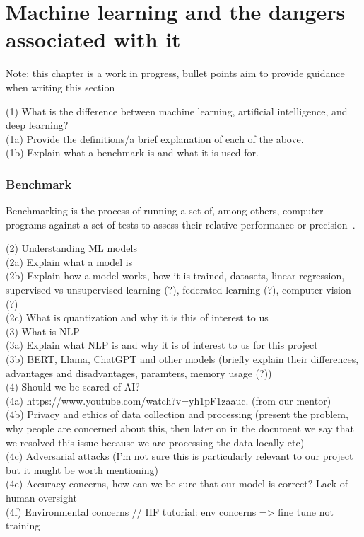 \documentclass[licencjacka,en]{pracamgr}
\begin{document}
\chapter{Machine learning and the dangers associated with it}
Note: this chapter is a work in progress, bullet points aim to provide guidance when writing this section

(1) What is the difference between machine learning, artificial intelligence, and deep learning? \\
(1a) Provide the definitions/a brief explanation of each of the above.\\
(1b) Explain what a benchmark is and what it is used for. \\

\subsection{Benchmark}
Benchmarking is the process of running a set of, among others, computer programs against a set of tests to assess their relative performance or precision~\cite{benchmark}.

(2) Understanding ML models \\
(2a) Explain what a model is \\
(2b) Explain how a model works, how it is trained, datasets, linear regression, supervised vs unsupervised learning (?), federated learning (?), computer vision (?) \\
(2c) What is quantization and why it is this of interest to us \\

(3) What is NLP \\
(3a) Explain what NLP is and why it is of interest to us for this project \\
(3b) BERT, Llama, ChatGPT and other models (briefly explain their differences, advantages and disadvantages, paramters, memory usage (?)) \\

(4) Should we be scared of AI? \\
(4a) https://www.youtube.com/watch?v=yh1pF1zaauc. (from our mentor) \\
(4b) Privacy and ethics of data collection and processing (present the problem, why people are concerned about this, then later on in the document we say that we resolved this issue because we are processing the data locally etc) \\
(4c) Adversarial attacks (I'm not sure this is particularly relevant to our project but it mught be worth mentioning) \\
(4e) Accuracy concerns, how can we be sure that our model is correct? Lack of human oversight \\
(4f) Environmental concerns
// HF tutorial: env concerns => fine tune not training 
\end{document}
